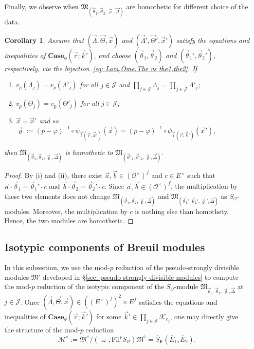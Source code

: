 \documentclass[11pt]{amsart}
\theoremstyle{definition}
\numberwithin{equation}{subsection}
\theoremstyle{plain}
\theoremstyle{plain}
\theoremstyle{plain}
\theoremstyle{plain}
\theoremstyle{plain}
\theoremstyle{plain}
\theoremstyle{plain}
\theoremstyle{plain}
\theoremstyle{plain}
\theoremstyle{plain}
\theoremstyle{plain}
\newtheorem{coro}[equation]{Corollary}
\theoremstyle{plain}
\theoremstyle{definition}
\theoremstyle{definition}
\theoremstyle{definition}
\theoremstyle{remark}
\renewcommand{\(}{\textup{(}}
\renewcommand{\)}{\textup{)}}
\newcommand{\F}{\mathbf{F}}
\newcommand{\barS}{\overline{S}}
\newcommand{\cM}{\mathcal{M}}
\newcommand{\fM}{\mathfrak{M}}
\newcommand{\Fil}{\mathrm{Fil}}
\newcommand{\cO}{\mathcal{O}}
\newcommand{\cJ}{\mathcal{J}}
\newcommand{\barE}{\overline{E}}
\newcommand{\vx}{\vec{x}}
\newcommand{\vr}{\vec{r}}
\newcommand{\vl}{\vec{l}}
\newcommand{\vk}{\vec{k}}
\newcommand{\cK}{\mathcal{K}}
\newcommand{\vth}{\vec{\theta}}
\newcommand{\vrho}{\vec{\varrho}}
\newcommand{\vDel}{\vec{\Delta}}
\newcommand{\vLam}{\vec{\Lambda}}
\newcommand{\vTh}{\vec{\Theta}}
\begin{document}
Finally, we observe when $\fM_{(\vth_1,\vth_2,\vrho,\vDel)}$ are homothetic for different choice of the data.
\begin{coro}
Assume that $(\vLam,\vTh,\vx)$ and $(\vLam',\vTh',\vx')$ satisfy the equations and inequalities of $\mathbf{Case}_\phi(\vr;\vk')$, and choose $(\vth_1,\vth_2)$ and $(\vth_1',\vth_2')$, respectively, via the bijection~\eqref{eq: Lam,Ome,The vs the1,the2}. If
\begin{enumerate}
\item $v_p(\Lambda_j)=v_p(\Lambda'_j)$ for all $j\in\cJ$ and $\prod_{j\in\cJ}\Lambda_j=\prod_{j\in\cJ}\Lambda'_j$;
\item $v_p(\Theta_j)=v_p(\Theta'_j)$ for all $j\in\cJ$;
\item $\vx=\vx'$ and so $\vrho:=(p-\varphi)^{-1}\circ\psi_{\vl(\vr;\vk')}(\vx)=(p-\varphi)^{-1}\circ\psi_{\vl(\vr;\vk')}(\vx')$,
\end{enumerate}
then $\fM_{(\vth_1,\vth_2,\vrho,\vDel)}$ is homothetic to $\fM_{(\vth'_1,\vth'_2,\vrho,\vDel)}$.
\end{coro}
\begin{proof}
By (i) and (ii), there exist $\vec{a},\vec{b}\in(\cO^{\times})^f$ and $c\in E^\times$ such that $\vec{a}\cdot \vth_1=\vth_1'\cdot c$ and $\vec{b}\cdot \vth_2=\vth_2'\cdot c$. Since $\vec{a},\vec{b}\in(\cO^{\times})^f$, the multiplication by these two elements does not change $\fM_{(\vth_1,\vth_2,\vrho,\vDel)}$ and $\fM_{(\vth_1',\vth_2',\vrho',\vDel)}$ as $S_\cO$-modules. Moreover, the multiplication by $c$ is nothing else than homothety. Hence, the two modules are homothetic.
\end{proof}



\subsection{Isotypic components of Breuil modules}\label{subsec: mod p reduction}
In this subsection, we use the mod-$p$ reduction of the pseudo-strongly divisible modules $\fM'$ developed in \S\ref{sec: pseudo strongly divisible modules}
to compute the mod-$p$ reduction of the isotypic component of the $S_\cO$-module $\fM_{\vth_1,\vth_2,\vrho,\vDel}$ at $j\in\cJ$. Once $(\vLam,\vTh,\vx)\in ((E^\times)^f)^{2}\times E^f$ satisfies the equations and inequalities of $\mathbf{Case}_\phi(\vr;\vk')$ for some $\vk'\in\prod_{j\in\cJ}\cK_{r_j}$, one may directly give the structure of the mod-$p$ reduction $$\cM^\diamond:=\fM^\diamond/(\varpi,\Fil^pS_{\cO})\fM^\diamond=\barS_\F(\barE_1,\barE_2).$$
\end{document}
